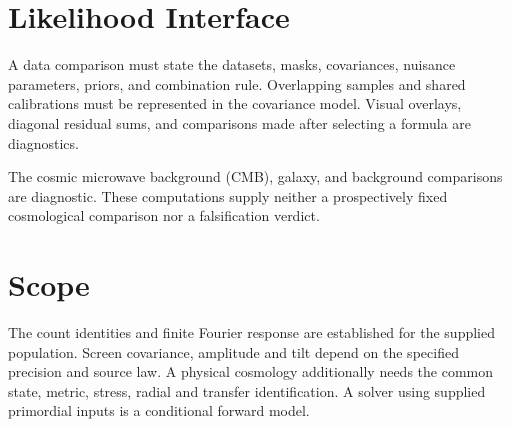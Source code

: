 \documentclass[11pt]{article}
\theoremstyle{remark}
\begin{document}
\section{Likelihood Interface}

A data comparison must state the datasets, masks, covariances, nuisance
parameters, priors, and combination rule. Overlapping samples and shared
calibrations must be represented in the covariance model. Visual overlays,
diagonal residual sums, and comparisons made after selecting a formula are
diagnostics.

The cosmic microwave background (CMB), galaxy, and background comparisons are
diagnostic. These computations supply neither a prospectively fixed
cosmological comparison nor a falsification verdict.

\section{Scope}
The count identities and finite Fourier response are established for the
supplied population. Screen covariance, amplitude and tilt depend on the
specified precision and source law. A physical cosmology additionally needs
the common state, metric, stress, radial and transfer identification.
A solver using supplied primordial inputs is a conditional forward model.
\end{document}
